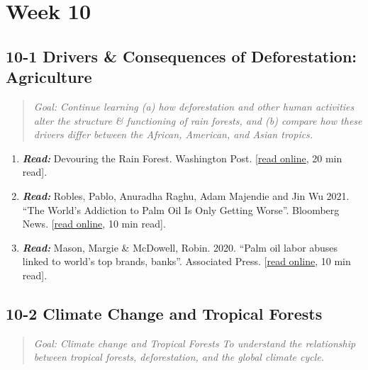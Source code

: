 \documentclass[
  10pt,
  letterpaper,
  oneside,
  open=any]{scrbook}
\begin{document}
\section{Week 10}\label{week-10}

\subsection*{10-1 Drivers \& Consequences of Deforestation:
Agriculture}\label{drivers-consequences-of-deforestation-agriculture}

\begin{quote}
\emph{Goal: Continue learning (a) how deforestation and other human
activities alter the structure \& functioning of rain forests, and (b)
compare how these drivers differ between the African, American, and
Asian tropics.}
\end{quote}

\begin{enumerate}
\def\labelenumi{\arabic{enumi}.}
\item
  \textbf{\emph{Read:}} Devouring the Rain Forest. Washington Post.
  {[}\href{https://www.washingtonpost.com/world/interactive/2022/amazon-beef-deforestation-brazil/}{read
  online}, 20 min read{]}.
\item
  \textbf{\emph{Read:}} Robles, Pablo, Anuradha Raghu, Adam Majendie and
  Jin Wu 2021. ``The World's Addiction to Palm Oil Is Only Getting
  Worse''. Bloomberg News.
  {[}\href{https://www.bloomberg.com/graphics/2021-palm-oil-deforestation-climate-change/}{read
  online}, 10 min read{]}.
\item
  \textbf{\emph{Read:}} Mason, Margie \& McDowell, Robin. 2020. ``Palm
  oil labor abuses linked to world's top brands, banks''. Associated
  Press.
  {[}\href{https://apnews.com/article/virus-outbreak-only-on-ap-indonesia-financial-markets-malaysia-7b634596270cc6aa7578a062a30423bb}{read
  online}, 10 min read{]}.
\end{enumerate}

\subsection*{10-2 Climate Change and Tropical
Forests}\label{climate-change-and-tropical-forests}

\begin{quote}
\emph{Goal: Climate change and Tropical Forests To understand the
relationship between tropical forests, deforestation, and the global
climate cycle.}
\end{quote}
\end{document}
